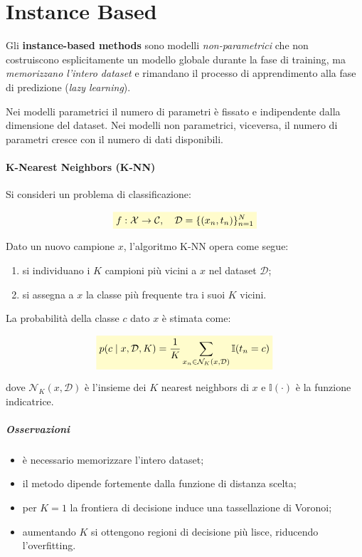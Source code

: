 \documentclass[a4paper,12pt]{report}
\newcommand{\highlight}[1]{%
\colorbox{yellow!20}{$\displaystyle #1$}%
}
\begin{document}
\chapter{Instance Based}

Gli \textbf{instance-based methods} sono modelli \emph{non-parametrici} che non costruiscono esplicitamente un modello globale durante la fase di training, ma \emph{memorizzano l’intero dataset} e rimandano il processo di apprendimento alla fase di predizione (\emph{lazy learning}).

Nei modelli parametrici il numero di parametri è fissato e indipendente dalla dimensione del dataset.
Nei modelli non parametrici, viceversa, il numero di parametri cresce con il numero di dati disponibili.

\subsubsection{K-Nearest Neighbors (K-NN)}

Si consideri un problema di classificazione:

\[
\highlight{
f : \mathcal{X} \rightarrow \mathcal{C},
\quad
\mathcal{D} = \{(x_n, t_n)\}_{n=1}^N}
\]

Dato un nuovo campione $x$, l’algoritmo K-NN opera come segue:
\begin{enumerate}
    \item si individuano i $K$ campioni più vicini a $x$ nel dataset $\mathcal{D}$;
    \item si assegna a $x$ la classe più frequente tra i suoi $K$ vicini.
\end{enumerate}

La probabilità della classe $c$ dato $x$ è stimata come:

\[
\highlight{
p(c \mid x, \mathcal{D}, K) =
\frac{1}{K}
\sum_{x_n \in \mathcal{N}_K(x, \mathcal{D})}
\mathbb{I}(t_n = c)}
\]

dove $\mathcal{N}_K(x, \mathcal{D})$ è l’insieme dei $K$ nearest neighbors di $x$ e $\mathbb{I}(\cdot)$ è la funzione indicatrice.

\paragraph{Osservazioni}
\begin{itemize}
    \item è necessario memorizzare l’intero dataset;
    \item il metodo dipende fortemente dalla funzione di distanza scelta;
    \item per $K=1$ la frontiera di decisione induce una tassellazione di Voronoi;
    \item aumentando $K$ si ottengono regioni di decisione più lisce, riducendo l’overfitting.
\end{itemize}
\end{document}
